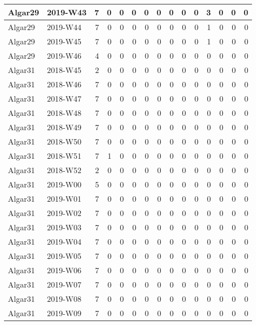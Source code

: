 \documentclass[]{book}
\begin{document}
\begin{table}
\begin{tabular}[t]{l|l|r|r|r|r|r|r|r|r|r|r|r|r|r}
\hline
Algar29 & 2019-W43 & 7 & 0 & 0 & 0 & 0 & 0 & 0 & 0 & 0 & 3 & 0 & 0 & 0\\
\hline
Algar29 & 2019-W44 & 7 & 0 & 0 & 0 & 0 & 0 & 0 & 0 & 0 & 1 & 0 & 0 & 0\\
\hline
Algar29 & 2019-W45 & 7 & 0 & 0 & 0 & 0 & 0 & 0 & 0 & 0 & 1 & 0 & 0 & 0\\
\hline
Algar29 & 2019-W46 & 4 & 0 & 0 & 0 & 0 & 0 & 0 & 0 & 0 & 0 & 0 & 0 & 0\\
\hline
Algar31 & 2018-W45 & 2 & 0 & 0 & 0 & 0 & 0 & 0 & 0 & 0 & 0 & 0 & 0 & 0\\
\hline
Algar31 & 2018-W46 & 7 & 0 & 0 & 0 & 0 & 0 & 0 & 0 & 0 & 0 & 0 & 0 & 0\\
\hline
Algar31 & 2018-W47 & 7 & 0 & 0 & 0 & 0 & 0 & 0 & 0 & 0 & 0 & 0 & 0 & 0\\
\hline
Algar31 & 2018-W48 & 7 & 0 & 0 & 0 & 0 & 0 & 0 & 0 & 0 & 0 & 0 & 0 & 0\\
\hline
Algar31 & 2018-W49 & 7 & 0 & 0 & 0 & 0 & 0 & 0 & 0 & 0 & 0 & 0 & 0 & 0\\
\hline
Algar31 & 2018-W50 & 7 & 0 & 0 & 0 & 0 & 0 & 0 & 0 & 0 & 0 & 0 & 0 & 0\\
\hline
Algar31 & 2018-W51 & 7 & 1 & 0 & 0 & 0 & 0 & 0 & 0 & 0 & 0 & 0 & 0 & 0\\
\hline
Algar31 & 2018-W52 & 2 & 0 & 0 & 0 & 0 & 0 & 0 & 0 & 0 & 0 & 0 & 0 & 0\\
\hline
Algar31 & 2019-W00 & 5 & 0 & 0 & 0 & 0 & 0 & 0 & 0 & 0 & 0 & 0 & 0 & 0\\
\hline
Algar31 & 2019-W01 & 7 & 0 & 0 & 0 & 0 & 0 & 0 & 0 & 0 & 0 & 0 & 0 & 0\\
\hline
Algar31 & 2019-W02 & 7 & 0 & 0 & 0 & 0 & 0 & 0 & 0 & 0 & 0 & 0 & 0 & 0\\
\hline
Algar31 & 2019-W03 & 7 & 0 & 0 & 0 & 0 & 0 & 0 & 0 & 0 & 0 & 0 & 0 & 0\\
\hline
Algar31 & 2019-W04 & 7 & 0 & 0 & 0 & 0 & 0 & 0 & 0 & 0 & 0 & 0 & 0 & 0\\
\hline
Algar31 & 2019-W05 & 7 & 0 & 0 & 0 & 0 & 0 & 0 & 0 & 0 & 0 & 0 & 0 & 0\\
\hline
Algar31 & 2019-W06 & 7 & 0 & 0 & 0 & 0 & 0 & 0 & 0 & 0 & 0 & 0 & 0 & 0\\
\hline
Algar31 & 2019-W07 & 7 & 0 & 0 & 0 & 0 & 0 & 0 & 0 & 0 & 0 & 0 & 0 & 0\\
\hline
Algar31 & 2019-W08 & 7 & 0 & 0 & 0 & 0 & 0 & 0 & 0 & 0 & 0 & 0 & 0 & 0\\
\hline
Algar31 & 2019-W09 & 7 & 0 & 0 & 0 & 0 & 0 & 0 & 0 & 0 & 0 & 0 & 0 & 0\\

\end{tabular}
\end{table}
\end{document}
